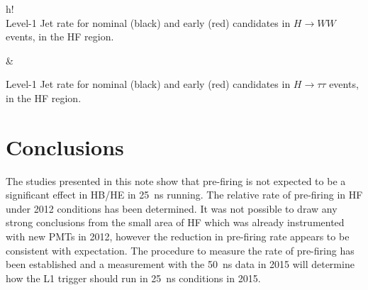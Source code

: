 \documentclass[11pt]{cmspaperpdf}
\begin{document}
\begin{2figures}{h!}
 \\
\caption{Level-1 Jet rate for nominal (black) and early (red) candidates in $ H \rightarrow WW$ events, in the HF region.}\label{fig:p3_hf}  &
\caption{Level-1 Jet rate for nominal (black) and early (red) candidates in $ H \rightarrow \tau \tau$ events, in the HF region.}\label{fig:p4_hf} 
\end{2figures}

\section{Conclusions}

The studies presented in this note show that pre-firing is not expected to be a significant effect in HB/HE in 25~ns running. The relative rate of pre-firing in HF under 2012 conditions has been determined. It was not possible to draw any strong conclusions from the small area of HF which was already instrumented with new PMTs in 2012, however the reduction in pre-firing rate appears to be consistent with expectation. The procedure to measure the rate of pre-firing has been established and a measurement with the 50~ns data in 2015 will determine how the L1 trigger should run in 25~ns conditions in 2015.
\end{document}

